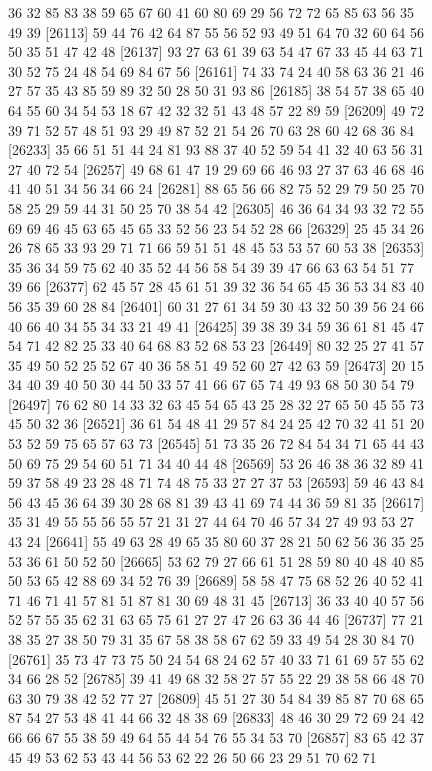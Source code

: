 \documentclass{article}
\begin{document}
\begin{figure}[H]
\begin{Schunk}
\begin{Soutput}
[26089] 36 32 85 83 38 59 65 67 60 41 60 80 69 29 56 72 72 65 85 63 56 35 49 39
[26113] 59 44 76 42 64 87 55 56 52 93 49 51 64 70 32 60 64 56 50 35 51 47 42 48
[26137] 93 27 63 61 39 63 54 47 67 33 45 44 63 71 30 52 75 24 48 54 69 84 67 56
[26161] 74 33 74 24 40 58 63 36 21 46 27 57 35 43 85 59 89 32 50 28 50 31 93 86
[26185] 38 54 57 38 65 40 64 55 60 34 54 53 18 67 42 32 32 51 43 48 57 22 89 59
[26209] 49 72 39 71 52 57 48 51 93 29 49 87 52 21 54 26 70 63 28 60 42 68 36 84
[26233] 35 66 51 51 44 24 81 93 88 37 40 52 59 54 41 32 40 63 56 31 27 40 72 54
[26257] 49 68 61 47 19 29 69 66 46 93 27 37 63 46 68 46 41 40 51 34 56 34 66 24
[26281] 88 65 56 66 82 75 52 29 79 50 25 70 58 25 29 59 44 31 50 25 70 38 54 42
[26305] 46 36 64 34 93 32 72 55 69 69 46 45 63 65 45 65 33 52 56 23 54 52 28 66
[26329] 25 45 34 26 26 78 65 33 93 29 71 71 66 59 51 51 48 45 53 53 57 60 53 38
[26353] 35 36 34 59 75 62 40 35 52 44 56 58 54 39 39 47 66 63 63 54 51 77 39 66
[26377] 62 45 57 28 45 61 51 39 32 36 54 65 45 36 53 34 83 40 56 35 39 60 28 84
[26401] 60 31 27 61 34 59 30 43 32 50 39 56 24 66 40 66 40 34 55 34 33 21 49 41
[26425] 39 38 39 34 59 36 61 81 45 47 54 71 42 82 25 33 40 64 68 83 52 68 53 23
[26449] 80 32 25 27 41 57 35 49 50 52 25 52 67 40 36 58 51 49 52 60 27 42 63 59
[26473] 20 15 34 40 39 40 50 30 44 50 33 57 41 66 67 65 74 49 93 68 50 30 54 79
[26497] 76 62 80 14 33 32 63 45 54 65 43 25 28 32 27 65 50 45 55 73 45 50 32 36
[26521] 36 61 54 48 41 29 57 84 24 25 42 70 32 41 51 20 53 52 59 75 65 57 63 73
[26545] 51 73 35 26 72 84 54 34 71 65 44 43 50 69 75 29 54 60 51 71 34 40 44 48
[26569] 53 26 46 38 36 32 89 41 59 37 58 49 23 28 48 71 74 48 75 33 27 27 37 53
[26593] 59 46 43 84 56 43 45 36 64 39 30 28 68 81 39 43 41 69 74 44 36 59 81 35
[26617] 35 31 49 55 55 56 55 57 21 31 27 44 64 70 46 57 34 27 49 93 53 27 43 24
[26641] 55 49 63 28 49 65 35 80 60 37 28 21 50 62 56 36 35 25 53 36 61 50 52 50
[26665] 53 62 79 27 66 61 51 28 59 80 40 48 40 85 50 53 65 42 88 69 34 52 76 39
[26689] 58 58 47 75 68 52 26 40 52 41 71 46 71 41 57 81 51 87 81 30 69 48 31 45
[26713] 36 33 40 40 57 56 52 57 55 35 62 31 63 65 75 61 27 27 47 26 63 36 44 46
[26737] 77 21 38 35 27 38 50 79 31 35 67 58 38 58 67 62 59 33 49 54 28 30 84 70
[26761] 35 73 47 73 75 50 24 54 68 24 62 57 40 33 71 61 69 57 55 62 34 66 28 52
[26785] 39 41 49 68 32 58 27 57 55 22 29 38 58 66 48 70 63 30 79 38 42 52 77 27
[26809] 45 51 27 30 54 84 39 85 87 70 68 65 87 54 27 53 48 41 44 66 32 48 38 69
[26833] 48 46 30 29 72 69 24 42 66 66 67 55 38 59 49 64 55 44 54 76 55 34 53 70
[26857] 83 65 42 37 45 49 53 62 53 43 44 56 53 62 22 26 50 66 23 29 51 70 62 71

\end{Soutput}
\end{Schunk}
\end{figure}
\end{document}
